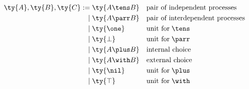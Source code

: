 \begin{definition}[Types]\label{def:cp-types}
  \begin{gather*}
    \begin{aligned}
      \ty{A}, \ty{B}, \ty{C}
           :=& \; \ty{A \tens B} &&\text{pair of independent processes}
      \\ \mid& \; \ty{A \parr B} &&\text{pair of interdependent processes}
      \\ \mid& \; \ty{\one}      &&\text{unit for} \; {\tens}
      \\ \mid& \; \ty{\bot}      &&\text{unit for} \; {\parr}
      \\ \mid& \; \ty{A \plus B} &&\text{internal choice}
      \\ \mid& \; \ty{A \with B} &&\text{external choice}
      \\ \mid& \; \ty{\nil}      &&\text{unit for} \; {\plus}
      \\ \mid& \; \ty{\top}      &&\text{unit for} \; {\with}
    \end{aligned}
  \end{gather*}
\end{definition}

